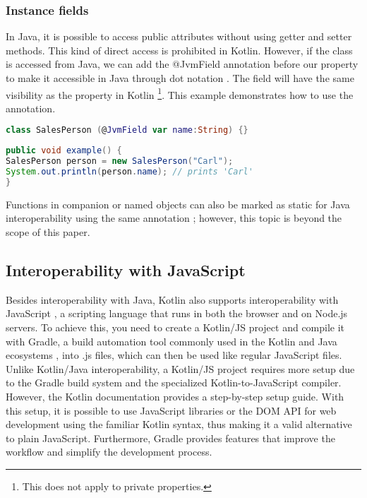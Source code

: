 \documentclass[a4paper,11pt]{article}
\begin{document}
\subsubsection{Instance fields}
In Java, it is possible to access public attributes without using getter and setter methods. This kind of direct access is prohibited in Kotlin. However, if the class is accessed from Java, we can add the @JvmField annotation before our property to make it accessible in Java through dot notation \cite{interop-instance-fields}. The field will have the same visibility as the property in Kotlin \footnote{This does not apply to private properties.}.
This example demonstrates how to use the annotation.
\begin{lstlisting}[language=Kotlin]
class SalesPerson (@JvmField var name:String) {}
\end{lstlisting}
\begin{lstlisting}[language=Java]
public void example() {
SalesPerson person = new SalesPerson("Carl");
System.out.println(person.name); // prints 'Carl'
}
\end{lstlisting}

Functions in companion or named objects can also be marked as static for Java interoperability using the same annotation \cite{interop-static-fields}; however, this topic is beyond the scope of this paper.

\subsection{Interoperability with JavaScript}
Besides interoperability with Java, Kotlin also supports interoperability with JavaScript \cite{interopjs}, a scripting language that runs in both the browser and on Node.js servers. To achieve this, you need to create a Kotlin/JS project and compile it with Gradle, a build automation tool commonly used in the Kotlin and Java ecosystems \cite{gradle}, into .js files, which can then be used like regular JavaScript files. Unlike Kotlin/Java interoperability, a Kotlin/JS project requires more setup due to the Gradle build system and the specialized Kotlin-to-JavaScript compiler. However, the Kotlin documentation \cite{interopjs} provides a step-by-step setup guide. With this setup, it is possible to use JavaScript libraries or the DOM API \cite{interopjs-dom} for web development using the familiar Kotlin syntax, thus making it a valid alternative to plain JavaScript. Furthermore, Gradle provides features that improve the workflow and simplify the development process.
\end{document}
